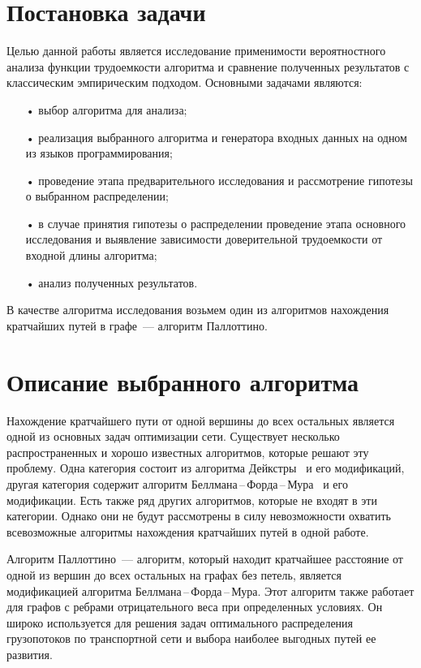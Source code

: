 \documentclass[a4paper,fontsize=14pt]{article}
\begin{document}
\section{Постановка задачи} \label{sec:problem_statement}

Целью данной работы является исследование применимости вероятностного анализа функции трудоемкости алгоритма и сравнение полученных результатов с классическим эмпирическим подходом. Основными задачами являются:

\begin{enumerate}
	\item[•] выбор алгоритма для анализа;

	\item[•] реализация выбранного алгоритма и генератора входных данных на одном из языков программирования;

	\item[•] проведение этапа предварительного исследования и рассмотрение гипотезы о выбранном распределении;

	\item[•] в случае принятия гипотезы о распределении проведение этапа основного исследования и выявление зависимости доверительной трудоемкости от входной длины алгоритма;
	
	\item[•] анализ полученных результатов.
\end{enumerate}

В качестве алгоритма исследования возьмем один из алгоритмов нахождения кратчайших путей в графе~--- алгоритм Паллоттино.

\section{Описание выбранного алгоритма} \label{sec:pallotino_algorithm}

Нахождение кратчайшего пути от одной вершины до всех остальных является одной из основных задач оптимизации сети. Существует несколько распространенных и хорошо известных алгоритмов, которые решают эту проблему. Одна категория состоит из алгоритма Дейкстры~\cite{dijkstra} и его модификаций, другая категория содержит алгоритм Беллмана\,--\,Форда\,--\,Мура~\cite{bellman, ford, moore} и его модификации. Есть также ряд других алгоритмов, которые не входят в эти категории. Однако они не будут рассмотрены в силу невозможности охватить всевозможные алгоритмы нахождения кратчайших путей в одной работе.

Алгоритм Паллоттино~--- алгоритм, который находит кратчайшее расстояние от одной из вершин до всех остальных на графах без петель, является модификацией алгоритма Беллмана\,--\,Форда\,--\,Мура. Этот алгоритм также работает для графов с ребрами отрицательного веса при определенных условиях. Он широко используется для решения задач оптимального распределения грузопотоков по транспортной сети и выбора наиболее выгодных путей ее развития.
\end{document}
